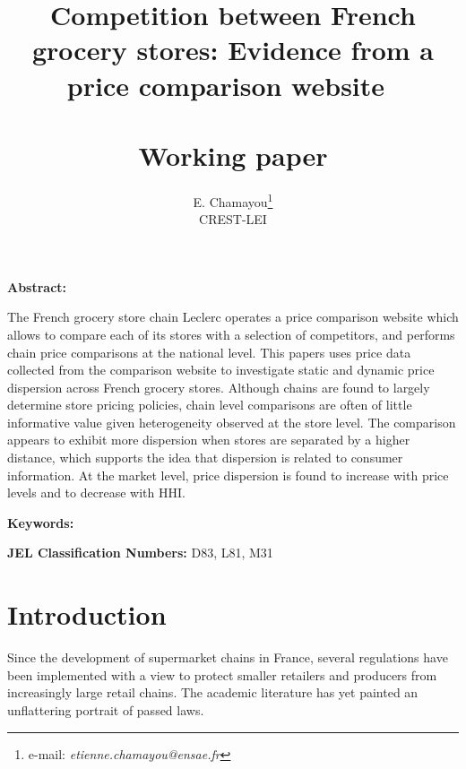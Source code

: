 \documentclass[english]{article}
\begin{document}
\title{Competition between French grocery stores: Evidence from a price comparison website\ \\ \ \\Working paper}
\author{E. Chamayou\thanks{e-mail:
\textit{etienne.chamayou@ensae.fr}} \\ CREST-LEI}
\maketitle

\sloppy%

\onehalfspacing

\textbf{Abstract:}

The French grocery store chain Leclerc operates a price comparison website which allows to compare each of its stores with a selection of competitors, and performs chain price comparisons at the national level. This papers uses price data collected from the comparison website to investigate static and dynamic price dispersion across French grocery stores. Although chains are found to largely determine store pricing policies, chain level comparisons are often of little informative value given heterogeneity observed at the store level. The comparison appears to exhibit more dispersion when stores are separated by a higher distance, which supports the idea that dispersion is related to consumer information. At the market level, price dispersion is found to increase with price levels and to decrease with HHI.

\strut

\textbf{Keywords:}

\strut

\textbf{JEL Classification Numbers:} D83, L81, M31

\pagebreak%

\section{Introduction}

Since the development of supermarket chains in France, several regulations have been implemented with a view to protect smaller retailers and producers from increasingly large retail chains. The academic literature has yet painted an unflattering portrait of passed laws.

\end{document}
